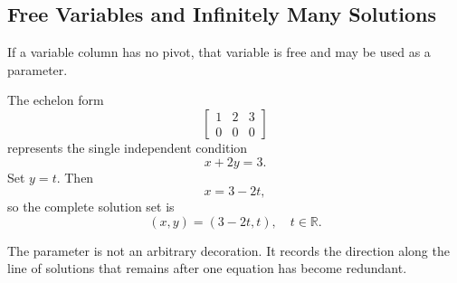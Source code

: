 \subsection{Free Variables and Infinitely Many Solutions}

If a variable column has no pivot, that variable is free and may be used as a parameter.

\begin{examplebox}
The echelon form
\[
\left[\begin{array}{cc|c}
1&2&3\\
0&0&0
\end{array}\right]
\]
represents the single independent condition
\[
x+2y=3.
\]
Set $y=t$. Then
\[
x=3-2t,
\]
so the complete solution set is
\[
\boxed{(x,y)=(3-2t,t),\quad t\in\mathbb R}.
\]
\end{examplebox}

The parameter is not an arbitrary decoration. It records the direction along the line of solutions that remains after one equation has become redundant.